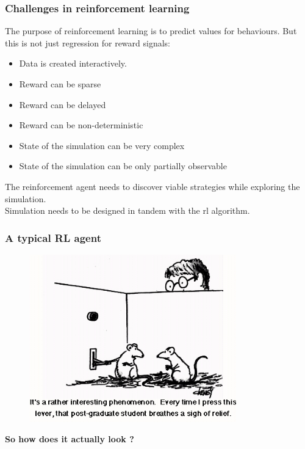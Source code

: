 \documentclass{beamer}
\begin{document}
\begin{frame}
\frametitle{Challenges in reinforcement learning}
The purpose of reinforcement learning is to predict values for behaviours.
But this is not just regression for reward signals:
\begin{itemize}
\item Data is created interactively.
\item Reward can be sparse
\item Reward can be delayed
\item Reward can be non-deterministic
\item State of the simulation can be very complex
\item State of the simulation can be only partially observable
\end{itemize}
\bigskip

The reinforcement agent needs to discover viable strategies while exploring the simulation.\\
\textrightarrow  Simulation needs to be designed in tandem with the rl algorithm.
\end{frame}

\begin{frame}
\frametitle{A typical RL agent}
\begin{figure}
\includegraphics[width=0.8\textwidth]{rat_cartoon.jpg}
\end{figure}
\end{frame}

\begin{frame}
\begin{center}
\textbf{So how does it actually look ?}
\end{center}
\end{frame}
\end{document}
